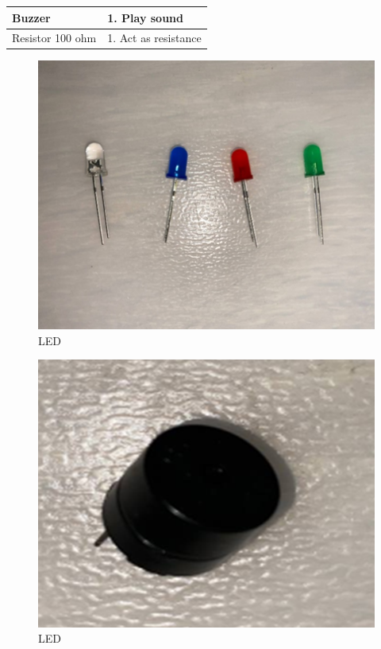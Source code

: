 \documentclass[conference]{IEEEtran}
\begin{document}
\begin{table}[]
\begin{center}
\begin{tabular}{|l|l|}
Buzzer                                                                     & 1. Play sound                                                                                                                                                              \\ \hline
Resistor 100 ohm                                                           & 1. Act as resistance                                                                                                                                                       \\ \hline
\end{tabular}
\end{center}
\end{table}




\begin{figure}[htbp]
\centerline{\includegraphics{image1.png}}
\caption{LED}
\label{fig}
\end{figure}

\begin{figure}[htbp]
\centerline{\includegraphics{image2.png}}
\caption{LED}
\label{fig}
\end{figure}
\end{document}
